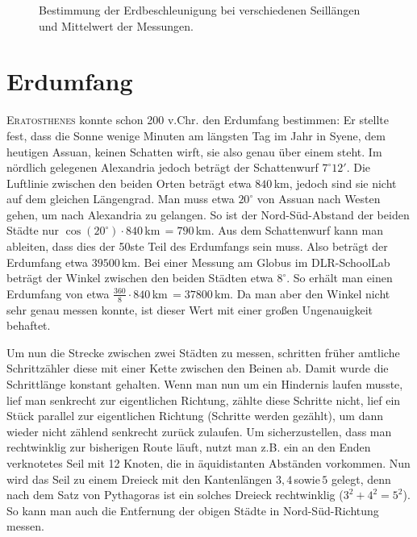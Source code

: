 \documentclass[12pt,a4paper,headinclude,bibtotoc]{scrartcl}
\begin{document}
\begin{figure}[!htb]
	\centering
	
	\caption{Bestimmung der Erdbeschleunigung bei verschiedenen Seillängen und Mittelwert der Messungen.}
	\label{fig:gbesch}
\end{figure}

\section{Erdumfang}
\textsc{Eratosthenes} konnte schon 200 v.Chr. den Erdumfang bestimmen:
Er stellte fest, dass die Sonne wenige Minuten am längsten Tag im Jahr in Syene, dem heutigen Assuan, keinen Schatten wirft, sie also genau über einem steht. Im nördlich gelegenen Alexandria jedoch beträgt der Schattenwurf $7^\circ12'$.
Die Luftlinie zwischen den beiden Orten beträgt etwa $840\,$km, jedoch sind sie nicht auf dem gleichen Längengrad. Man muss etwa $20^\circ$ von Assuan nach Westen gehen, um nach Alexandria zu gelangen.
So ist der Nord-Süd-Abstand der beiden Städte nur $\cos(20^\circ) \cdot 840\,$km$\,= 790\,$km.
Aus dem Schattenwurf kann man ableiten, dass dies der 50ste Teil des Erdumfangs sein muss.
Also beträgt der Erdumfang etwa $39500\,$km.
Bei einer Messung am Globus im DLR-SchoolLab beträgt der Winkel zwischen den beiden Städten etwa $8^\circ$.
So erhält man einen Erdumfang von etwa $\frac{360}{8} \cdot 840\,$km$\,=37800\,$km.
Da man aber den Winkel nicht sehr genau messen konnte, ist dieser Wert mit einer großen Ungenauigkeit behaftet.


Um nun die Strecke zwischen zwei Städten zu messen, schritten früher amtliche Schrittzähler diese mit einer Kette zwischen den Beinen ab.
Damit wurde die Schrittlänge konstant gehalten.
Wenn man nun um ein Hindernis laufen musste, lief man senkrecht zur eigentlichen Richtung, zählte diese Schritte nicht, lief ein Stück parallel  zur eigentlichen Richtung (Schritte werden gezählt), um dann wieder nicht zählend senkrecht zurück zulaufen.
Um sicherzustellen, dass man rechtwinklig zur bisherigen Route läuft, nutzt man z.B. ein an den Enden verknotetes Seil mit 12 Knoten, die in äquidistanten Abständen vorkommen.
Nun wird das Seil zu einem Dreieck mit den Kantenlängen $3,4\,$sowie$\,5$ gelegt, denn nach dem Satz von Pythagoras ist ein solches Dreieck rechtwinklig ($3^2+4^2=5^2$).
So kann man auch die Entfernung der obigen Städte in Nord-Süd-Richtung messen.
\end{document}
